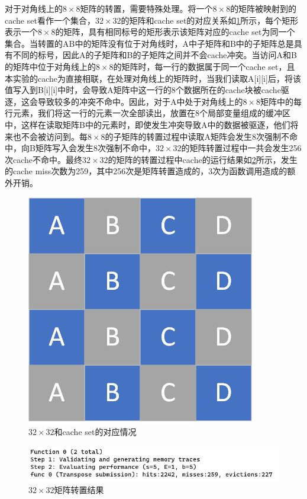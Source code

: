 \documentclass[supercite]{Experimental_Report}
\theoremstyle{definition}
\begin{document}
对于对角线上的$8\times8$矩阵的转置，需要特殊处理。将一个$8\times8$的矩阵被映射到的cache set看作一个集合，$32\times32$的矩阵和cache set的对应关系如\ref{fig2-2}所示，每个矩形表示一个$8\times8$的矩阵，具有相同标号的矩形表示该矩阵对应的cache set为同一个集合。当转置的AB中的矩阵没有位于对角线时，A中子矩阵和B中的子矩阵总是具有不同的标号，因此A的子矩阵和B的子矩阵之间并不会cache冲突。当访问A和B的矩阵中位于对角线上的$8\times8$的矩阵时，每一行的数据属于同一个cache set，且本实验的cache为直接相联，在处理对角线上的矩阵时，当我们读取A[i][i]后，将该值写入到B[i][i]中时，会导致A矩阵中这一行的8个数据所在的cache块被cache驱逐，这会导致较多的冲突不命中。因此，对于A中处于对角线上的$8\times8$矩阵中的每行元素，我们将这一行的元素一次全部读出，放置在8个局部变量组成的缓冲区中，这样在读取矩阵B中的元素时，即使发生冲突导致A中的数据被驱逐，他们将来也不会被访问到。每$8\times8$的子矩阵的转置过程中读取A矩阵会发生8次强制不命中，向B矩阵写入会发生8次强制不命中，$32\times32$的矩阵转置过程中一共会发生256次cache不命中。最终$32\times32$的矩阵的转置过程中cache的运行结果如\ref{fig2-3}所示，发生的cache miss次数为259，其中256次是矩阵转置造成的，3次为函数调用造成的额外开销。

\begin{figure}[htb]
	\begin{center}
		\includegraphics[scale=0.45]{./images/lab2_2.jpg}
		\caption{$32\times32$和cache set的对应情况}
		\label{fig2-2}
	\end{center}
\end{figure}

\begin{figure}[htb]
	\begin{center}
		\includegraphics[scale=0.9]{./images/lab2_3.jpg}
		\caption{$32\times32$矩阵转置结果}
		\label{fig2-3}
	\end{center}
\end{figure}
\end{document}
